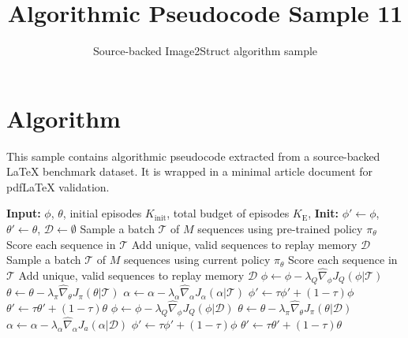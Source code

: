 \documentclass[11pt]{article}
\title{Algorithmic Pseudocode Sample 11}
\author{Source-backed Image2Struct algorithm sample}
\date{}
\begin{document}
\maketitle
\section{Algorithm}
This sample contains algorithmic pseudocode extracted from a source-backed LaTeX benchmark dataset. It is wrapped in a minimal article document for pdfLaTeX validation.

\begin{algorithm}[htbp]
\caption{Source-backed algorithmic procedure}
\begin{algorithmic}[1]
\Statex \textbf{Input:} $\phi$, $\theta$, initial episodes $K_{\mathrm{init}}$, total budget of episodes $K_{\mathrm{E}}$,
\Statex \textbf{Init:} $\phi' \gets \phi$, $\theta' \gets \theta$, $\mathcal{D} \gets \emptyset$
\State Sample a batch $\mathcal{T}$ of $M$ sequences using pre-trained policy $\pi_\theta$
\State Score each sequence in $\mathcal{T}$
\State Add unique, valid sequences to replay memory $\mathcal{D}$
\EndFor
{}
\State Sample a batch $\mathcal{T}$ of $M$ sequences using current policy $\pi_\theta$
\State Score each sequence in $\mathcal{T}$
\State Add unique, valid sequences to replay memory $\mathcal{D}$
\State $\phi \gets \phi - \lambda_Q \hat{\nabla}_\phi J_Q (\phi \vert \mathcal{T})$ 
\State $\theta \gets \theta - \lambda_\pi \hat{\nabla}_\theta J_\pi (\theta\vert \mathcal{T})$ 
\State $\alpha \gets \alpha - \lambda_\alpha \hat{\nabla}_\alpha J_\alpha (\alpha \vert \mathcal{T})$ 
\State $\phi' \gets \tau \phi' + (1-\tau) \phi$ 
\State $\theta' \gets \tau \theta' + (1-\tau) \theta$ 
\State $\phi \gets \phi - \lambda_Q \hat{\nabla}_\phi J_Q (\phi \vert \mathcal{D})$
\State $\theta \gets \theta - \lambda_\pi \hat{\nabla}_\theta J_\pi (\theta\vert \mathcal{D})$
\State $\alpha \gets \alpha - \lambda_\alpha \hat{\nabla}_\alpha J_a (\alpha \vert \mathcal{D})$
\State $\phi' \gets \tau \phi' + (1-\tau) \phi$
\State $\theta' \gets \tau \theta' + (1-\tau) \theta$
\EndFor
\EndFor
\end{algorithmic}
\end{algorithm}
\end{document}
